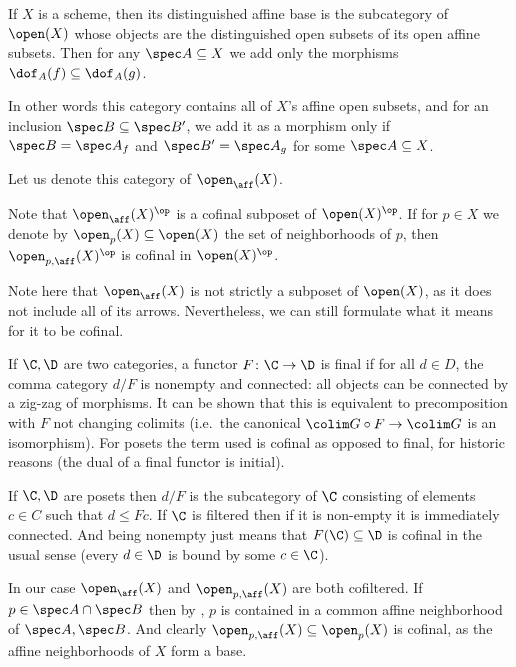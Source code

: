 \bdefn

    If $X$ is a scheme, then its {\emphcolor distinguished affine base} is the subcategory of $\open(X)$ whose objects are the distinguished open subsets of its open affine subsets.
    Then for any $\spec A\subseteq X$ we add only the morphisms $\dof_A(f)\subseteq\dof_A(g)$.

    In other words this category contains all of $X$'s affine open subsets, and for an inclusion $\spec B\subseteq\spec B'$, we add it as a morphism only if $\spec B=\spec A_f$ and $\spec B'=\spec A_g$
    for some $\spec A\subseteq X$.

    Let us denote this category of $\open_\aff(X)$.

\edefn

Note that $\open_\aff(X)^\op$ is a cofinal subposet of $\open(X)^\op$.
If for $p\in X$ we denote by $\open_p(X)\subseteq\open(X)$ the set of neighborhoods of $p$, then $\open_{p,\aff}(X)^\op$ is cofinal in $\open(X)^\op$.

\bremark

    Note here that $\open_\aff(X)$ is not strictly a subposet of $\open(X)$, as it does not include all of its arrows.
    Nevertheless, we can still formulate what it means for it to be cofinal.

    If $\C,\D$ are two categories, a functor $F\colon\C\to\D$ is {\emphcolor final} if for all $d\in D$, the comma category $d/F$ is nonempty and {\emphcolor connected}: all objects can be
    connected by a zig-zag of morphisms.
    It can be shown that this is equivalent to precomposition with $F$ not changing colimits (i.e.\ the canonical $\colim G\circ F\to\colim G$ is an isomorphism).
    For posets the term used is {\emphcolor cofinal} as opposed to final, for historic reasons (the dual of a final functor is {\emphcolor initial}).

    If $\C,\D$ are posets then $d/F$ is the subcategory of $\C$ consisting of elements $c\in C$ such that $d\leq Fc$.
    If $\C$ is filtered then if it is non-empty it is immediately connected.
    And being nonempty just means that $F(\C)\subseteq\D$ is cofinal in the usual sense (every $d\in\D$ is bound by some $c\in\C$).

    In our case $\open_\aff(X)$ and $\open_{p,\aff}(X)$ are both cofiltered.
    If $p\in\spec A\cap\spec B$ then by , $p$ is contained in a common affine neighborhood of $\spec A,\spec B$.
    And clearly $\open_{p,\aff}(X)\subseteq\open_p(X)$ is cofinal, as the affine neighborhoods of $X$ form a base.

